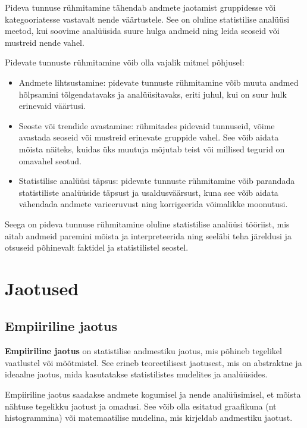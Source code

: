 \documentclass[
]{book}
\begin{document}
Pideva tunnuse rühmitamine tähendab andmete jaotamist gruppidesse või kategooriatesse vastavalt nende väärtustele. See on oluline statistilise analüüsi meetod, kui soovime analüüsida suure hulga andmeid ning leida seoseid või mustreid nende vahel.

Pidevate tunnuste rühmitamine võib olla vajalik mitmel põhjusel:

\begin{itemize}
\item
  Andmete lihtsustamine: pidevate tunnuste rühmitamine võib muuta andmed hõlpsamini tõlgendatavaks ja analüüsitavaks, eriti juhul, kui on suur hulk erinevaid väärtusi.
\item
  Seoste või trendide avastamine: rühmitades pidevaid tunnuseid, võime avastada seoseid või mustreid erinevate gruppide vahel. See võib aidata mõista näiteks, kuidas üks muutuja mõjutab teist või millised tegurid on omavahel seotud.
\item
  Statistilise analüüsi täpsus: pidevate tunnuste rühmitamine võib parandada statistiliste analüüside täpsust ja usaldusväärsust, kuna see võib aidata vähendada andmete varieeruvust ning korrigeerida võimalikke moonutusi.
\end{itemize}

Seega on pideva tunnuse rühmitamine oluline statistilise analüüsi tööriist, mis aitab andmeid paremini mõista ja interpreteerida ning seeläbi teha järeldusi ja otsuseid põhinevalt faktidel ja statistilistel seostel.

\section{Jaotused}\label{jaotused}

\subsection{Empiiriline jaotus}\label{empiiriline-jaotus}

\textbf{Empiiriline jaotus} on statistilise andmestiku jaotus, mis põhineb tegelikel vaatlustel või mõõtmistel. See erineb teoreetilisest jaotusest, mis on abstraktne ja ideaalne jaotus, mida kasutatakse statistilistes mudelites ja analüüsides.

Empiiriline jaotus saadakse andmete kogumisel ja nende analüüsimisel, et mõista nähtuse tegelikku jaotust ja omadusi. See võib olla esitatud graafikuna (nt histogrammina) või matemaatilise mudelina, mis kirjeldab andmestiku jaotust.
\end{document}
